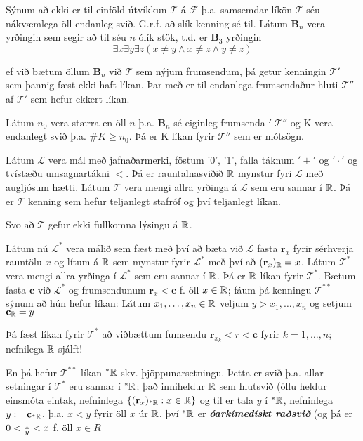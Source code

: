 \documentclass[12pt]{book}
\newcommand{\cT}{\mathcal{T}}
\newcommand{\cL}{\mathcal{L}}
\newcommand{\mb}[1]{\mathbf{#1}}
\newcommand{\mc}[1]{\mathcal{#1}}
\newcommand{\emphs}[1]{\textbf{\emph{#1}}}
\begin{document}
Sýnum að ekki er til einföld útvíkkun $\mathcal{T}$ á $\mc{F}$ þ.a.
samsemdar líkön $\mc{T}$ séu nákvæmlega öll endanleg svið. G.r.f. að
slík kenning sé til. Látum $\mb{B}_n$ vera yrðingin sem segir að til séu
$n$ ólík stök, t.d. er $\mb{B}_{3}$ yrðingin
\[\exists x \exists y \exists z ( x \neq y \wedge x \neq z \wedge y \neq z)\]

ef við bætum öllum $\mb{B}_n$ við $\cT$ sem nýjum frumsendum, þá getur kenningin
$\cT'$ sem þannig fæst ekki haft líkan. Þar með er til endanlega frumsendaður hluti
$\cT''$ af $\cT'$ sem hefur ekkert líkan.

Látum $n_0$ vera stærra en öll $n$ þ.a. $\mb{B}_n$ sé eiginleg frumsenda í
$\cT''$ og K vera endanlegt svið þ.a. $\#K \geq n_0$. Þá er K líkan fyrir
$\cT''$ sem er mótsögn.

\begin{daemi}
  Látum $\cL$ vera mál með jafnaðarmerki, föstum '0', '1',
  falla táknum $'+'$ og $'\cdot'$ og tvístæðu umsagnartákni $<$.
  Þá er rauntalnasviðið $\mathbb{R}$ mynstur fyri $\cL$ með augljósum hætti.
  Látum $\cT$ vera mengi allra yrðinga á $\cL$ sem eru sannar í $\mathbb{R}$.
  Þá er $\cT$ kenning sem hefur teljanlegt stafróf og því teljanlegt líkan.

  Svo að $\cT$ gefur ekki fullkomna lýsingu á $\mathbb{R}$.

  Látum nú $\cL^{*}$ vera málið sem fæst með því að bæta við $\cL$ fasta 
  $\mb{r}_x$ fyrir sérhverja rauntölu $x$ og lítum á $\mathbb{R}$
  sem mynstur fyrir $\cL^*$  með því að 
  $(\mb{r}_x)_{\R} = x$. Látum $\cT^*$ vera mengi allra
  yrðinga í $\cL^*$ sem eru sannar í $\mathbb{R}$.
  Þá er $\mathbb{R}$ líkan fyrir $\cT^*$. Bætum fasta $\mb{c}$ við 
  $\cL^*$ og frumsendunum $\mb{r}_x < \mb{c}$ f. öll
  $x \in \mathbb{R}$; fáum þá kenningu $\cT^{**}$ sýnum að hún hefur líkan:
  Látum $x_1, \dotsc, x_n \in \mathbb{R}$ veljum $y > x_1, \dotsc, x_n$
  og setjum $\mb{c}_{\R} = y$


  Þá fæst líkan fyrir $\cT^*$ að viðbættum fumsendu
  $\mb{r}_{x_k} < r < \mb{c}$ fyrir $k = 1, \dotsc, n$; nefnilega 
  $\mathbb{R}$ sjálft!

  En þá hefur $\cT^{**}$ líkan ${}^* \mathbb{R}$ skv. þjöppunarsetningu. Þetta er 
  svið þ.a. allar setningar í $\cT^*$ eru sannar í ${}^* \mathbb{R}$; það inniheldur
  $\mathbb{R}$ sem hlutsvið (öllu heldur einsmóta eintak, nefninlega 
  $\set{ (\mb{r}_x)_{{}^* \R}: x \in \R}$ og til er tala 
  $y$ í ${}^* \mathbb{R}$, nefninlega $y := \mb{c}_{{}^* \R}$,
  þ.a. $x < y$ fyrir öll $x$ úr $\mathbb{R}$, því ${}^* \mathbb{R}$ er
  \emphs{óarkímedískt raðsvið} (og þá er $0 < \frac{1}{y} < x$ f. öll $x \in R$
\end{daemi}
\end{document}
